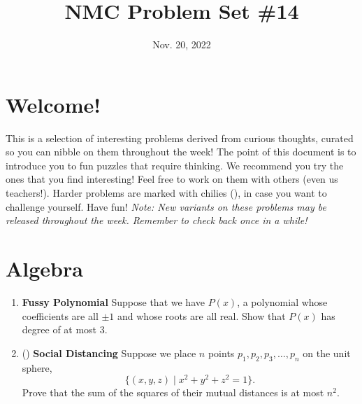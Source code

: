 \documentclass[11pt]{scrartcl}
\begin{document}
\title{NMC Problem Set \#14} %
\date{Nov. 20, 2022} %
\maketitle

\section*{Welcome!}

This is a selection of interesting problems derived from curious thoughts, curated so you can nibble on them throughout the week! The point of this document is to introduce you to fun puzzles that require thinking. We recommend you try the ones that you find interesting! Feel free to work on them with others (even us teachers!). Harder problems are marked with chilies (\fullchili), in case you want to challenge yourself.
\newline\newline
Have fun! \textit{Note: New variants on these problems may be released throughout the week. Remember to check back once in a while!}
    
\section{Algebra}
\begin{enumerate}[label=\textbf{A\arabic*}.]
    \item \textbf{Fussy Polynomial} \newline
    Suppose that we have $P(x)$, a polynomial whose coefficients are all $\pm 1$ and whose roots are all real. Show that $P(x)$ has degree of at most $3$.
    
    \item (\fullchili) \textbf{Social Distancing} \newline
    Suppose we place $n$ points $p_1, p_2, p_3, \dots, p_n$ on the unit sphere, \[ \{(x, y, z) \mid x^2 + y^2 + z^2 = 1\}. \]
    Prove that the sum of the squares of their mutual distances is at most $n^2$.
\end{enumerate}

\newpage
\end{document}
